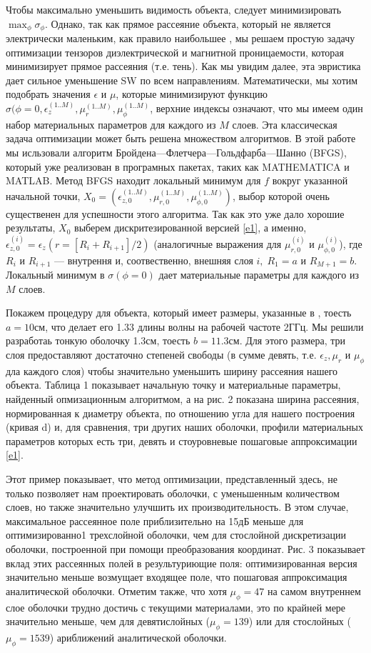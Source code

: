 \documentclass[a4paper, 12pt]{article}
\begin{document}
Чтобы максимально уменьшить видимость объекта, следует минимизировать 
$\max_\phi \sigma_\phi$. Однако, так как прямое рассеяние объекта, который не 
является электрически маленьким, как правило наибольшее \cite{12},
мы решаем простую задачу оптимизации тензоров диэлектрической и магнитной 
проницаемости, которая минимизирует прямое рассеяния (т.е. тень). Как мы увидим
далее, эта эвристика дает сильное уменьшение SW по всем направлениям.
Математически, мы хотим подобрать значения $\epsilon$ и $\mu$, которые 
минимизируют функцию $\sigma(\phi=0, \epsilon_z^{(1..M)}, \mu_r^{(1..M)}, 
\mu_\phi^{(1..M)}$, верхние индексы означают, что мы имеем один набор
материальных параметров для каждого из $M$ слоев. Эта классическая задача
оптимизации может быть решена множеством алгоритмов.
В этой работе мы исльзовали алгоритм Бройдена—Флетчера—Гольдфарба—Шанно (BFGS),
который уже реализован в програмных пакетах, таких как MATHEMATICA и MATLAB.
Метод BFGS находит локальный минимум для $f$ вокруг указанной начальной точки,
$X_0=(\epsilon_{z,0}^{(1..M)}, \mu_{r,0}^{(1..M)}, \mu_{\phi,0}^{(1..M)})$,
выбор которой очень существенен для успешности этого алгоритма.
Так как это уже дало хорошие результаты, $X_0$ выберем дискритезированной
версией \eqref{e1}, а именно, $\epsilon_{z,0}^{(i)}=\epsilon_z(r=[R_i+R_{i+1}]/2)$
(аналогичные выражения для $\mu_{r,0}^{(i)}$ и $\mu_{\phi,0}^{(i)}$), где
$R_i$ и $R_{i+1}$ --- внутрення и, соотвественно, внешняя слоя $i, \; R_1=a$ и
$R_{M+1}=b$. Локальный минимум в $\sigma(\phi=0)$ дает материальные параметры
для каждого из $M$ слоев.

Покажем процедуру для объекта, который имеет размеры, указанные в \cite{2},
тоесть $a=10$см, что делает его 1.33 длины волны на рабочей частоте 2ГГц.
Мы решили разработаь тонкую оболочку 1.3см, тоесть $b=11.3$см. Для этого 
размера, три слоя предоставляют достаточно степеней свободы (в сумме девять,
т.е. $\epsilon_z, \mu_r$ и $\mu_\phi$ дла каждого слоя) чтобы значительно
уменьшить ширину рассеяния нашего объекта. Таблица 1 показывает начальную точку
и материальные параметры, найденный опмизационным алгоритмом, а на рис. 2
показана  ширина рассеяния, нормированная к диаметру объекта, по отношению угла
для нашего построения (кривая d) и, для сравнения, три других наших оболочки,
профили материальных параметров которых есть три, девять и стоуровневые 
пошаговые аппроксимации \eqref{e1}.


Этот пример показывает, что метод оптимизации, представленный здесь,
не только позволяет нам проектировать оболочки, с уменьшенным количеством слоев,
но также значительно улучшить их производительность. В этом случае, максимальное
рассеянное поле приблизительно на 15дБ меньше для оптимизированно1 трехслойной
оболочки, чем для стослойной дискретизации оболочки, построенной при помощи
преобразования координат. Рис. 3 показывает вклад этих рассеянных полей в 
результуриющие поля: оптимизированная версия значительно меньше возмущает
входящее поле, что пошаговая аппроксимация аналитической оболочки.
Отметим также, что хотя $\mu_\phi=47$ на самом внутреннем слое оболочки
трудно достичь с текущими материалами, это по крайней мере значительно меньше,
чем для девятислойных ($\mu_\phi=139$) или для стослойных ($\mu_\phi=1539$)
ариближений аналитической оболочки.
\end{document}

